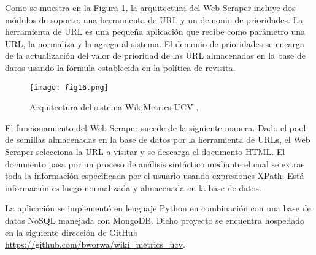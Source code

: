 Como se muestra en la Figura \ref{fig:fig16}, la arquitectura del Web Scraper incluye dos módulos de soporte: una herramienta de URL y un demonio de prioridades. La herramienta de URL es una pequeña aplicación que recibe como parámetro una URL, la normaliza y la agrega al sistema. El demonio de prioridades se encarga de la actualización del valor de prioridad de las URL almacenadas en la base de datos usando la fórmula establecida en la política de revisita.

\begin{figure}[htp]
  \centering
  \texttt{[image: fig16.png]}
  \caption[Arquitectura del sistema WikiMetrics-UCV]{Arquitectura del sistema WikiMetrics-UCV \cite[Fig. 3.1]{Dap12}.}
  \label{fig:fig16}
\end{figure}

El funcionamiento del Web Scraper sucede de la siguiente manera. Dado el pool de semillas almacenadas en la base de datos por la herramienta de URLs, el Web Scraper selecciona la URL a visitar y se descarga el documento HTML. El documento pasa por un proceso de análisis sintáctico mediante el cual se extrae toda la información especificada por el usuario usando expresiones XPath. Está información es luego normalizada y almacenada en la base de datos.

La aplicación se implementó en lenguaje Python en combinación con una base de datos NoSQL manejada con MongoDB. Dicho proyecto se encuentra hospedado en la siguiente dirección de GitHub \url{https://github.com/bworwa/wiki_metrics_ucv}.
